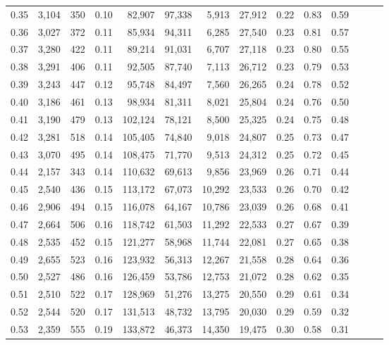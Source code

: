 \begin{tabular}{rrrrrrrrrrrrrr}
0.35 &  3,104 &  350 &  0.10 &   82,907 &   97,338 &   5,913 &  27,912 &  0.22 &  0.83 &      0.59 \\
0.36 &  3,027 &  372 &  0.11 &   85,934 &   94,311 &   6,285 &  27,540 &  0.23 &  0.81 &      0.57 \\
0.37 &  3,280 &  422 &  0.11 &   89,214 &   91,031 &   6,707 &  27,118 &  0.23 &  0.80 &      0.55 \\
0.38 &  3,291 &  406 &  0.11 &   92,505 &   87,740 &   7,113 &  26,712 &  0.23 &  0.79 &      0.53 \\
0.39 &  3,243 &  447 &  0.12 &   95,748 &   84,497 &   7,560 &  26,265 &  0.24 &  0.78 &      0.52 \\
0.40 &  3,186 &  461 &  0.13 &   98,934 &   81,311 &   8,021 &  25,804 &  0.24 &  0.76 &      0.50 \\
0.41 &  3,190 &  479 &  0.13 &  102,124 &   78,121 &   8,500 &  25,325 &  0.24 &  0.75 &      0.48 \\
0.42 &  3,281 &  518 &  0.14 &  105,405 &   74,840 &   9,018 &  24,807 &  0.25 &  0.73 &      0.47 \\
0.43 &  3,070 &  495 &  0.14 &  108,475 &   71,770 &   9,513 &  24,312 &  0.25 &  0.72 &      0.45 \\
0.44 &  2,157 &  343 &  0.14 &  110,632 &   69,613 &   9,856 &  23,969 &  0.26 &  0.71 &      0.44 \\
0.45 &  2,540 &  436 &  0.15 &  113,172 &   67,073 &  10,292 &  23,533 &  0.26 &  0.70 &      0.42 \\
0.46 &  2,906 &  494 &  0.15 &  116,078 &   64,167 &  10,786 &  23,039 &  0.26 &  0.68 &      0.41 \\
0.47 &  2,664 &  506 &  0.16 &  118,742 &   61,503 &  11,292 &  22,533 &  0.27 &  0.67 &      0.39 \\
0.48 &  2,535 &  452 &  0.15 &  121,277 &   58,968 &  11,744 &  22,081 &  0.27 &  0.65 &      0.38 \\
0.49 &  2,655 &  523 &  0.16 &  123,932 &   56,313 &  12,267 &  21,558 &  0.28 &  0.64 &      0.36 \\
0.50 &  2,527 &  486 &  0.16 &  126,459 &   53,786 &  12,753 &  21,072 &  0.28 &  0.62 &      0.35 \\
0.51 &  2,510 &  522 &  0.17 &  128,969 &   51,276 &  13,275 &  20,550 &  0.29 &  0.61 &      0.34 \\
0.52 &  2,544 &  520 &  0.17 &  131,513 &   48,732 &  13,795 &  20,030 &  0.29 &  0.59 &      0.32 \\
0.53 &  2,359 &  555 &  0.19 &  133,872 &   46,373 &  14,350 &  19,475 &  0.30 &  0.58 &      0.31 \\

\end{tabular}
